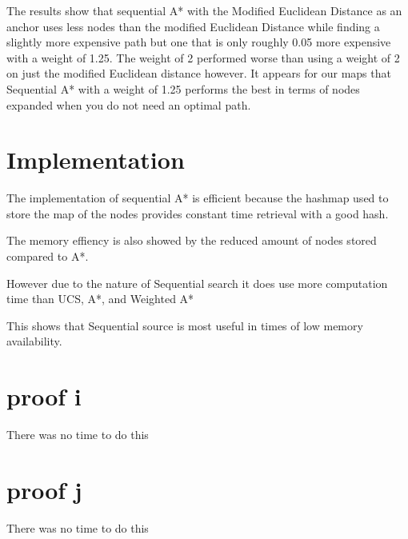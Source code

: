 \documentclass[11pt]{article} %
\begin{document}
The results show that sequential A* with the Modified Euclidean Distance as an anchor uses less nodes than the modified Euclidean Distance while finding a slightly more expensive path but one that is only roughly 0.05 more expensive with a weight of 1.25. The weight of 2 performed worse than using a weight of 2 on just the modified Euclidean distance however. It appears for our maps that Sequential A* with a weight of 1.25 performs the best in terms of nodes expanded when you do not need an optimal path.

\section{Implementation}
The implementation of sequential A* is efficient because the hashmap used to store the map of the nodes provides constant time retrieval with a good hash. 

The memory effiency is also showed by the reduced amount of nodes stored compared to A*. 

However due to the nature of Sequential search it does use more computation time than UCS, A*, and Weighted A*

This shows that Sequential source is most useful in times of low memory availability.

\section{proof i}
There was no time to do this

\section{proof j}
There was no time to do this
\end{document}
